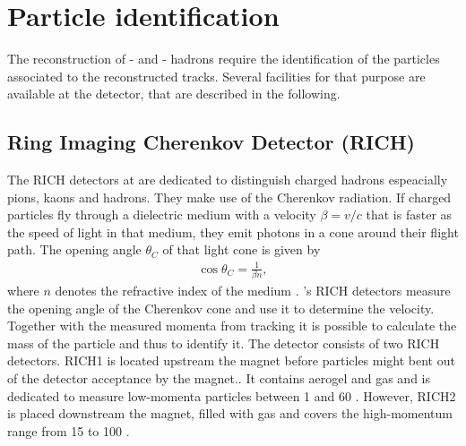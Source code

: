 \section{Particle identification}
The reconstruction of \bquark- and \cquark- hadrons require the identification of the particles associated to the reconstructed tracks.
Several facilities for that purpose are available at the \lhcb detector, that are described in the following.

\subsection{Ring Imaging Cherenkov Detector (RICH)}
The RICH detectors at \lhcb are dedicated to distinguish charged hadrons espeacially pions, kaons and hadrons.
They make use of the Cherenkov radiation.
If charged particles fly through a dielectric medium with a velocity $\beta = v/c$ that is faster as the speed of light in that medium, they emit photons in a cone around their flight path.
The opening angle $\theta_C$ of that light cone is given by
\begin{align}
    \cos \theta_C = \frac{1}{\beta n},
\end{align}
where $n$ denotes the refractive index of the medium \cite{Jackson_ED}.
\lhcb's RICH detectors measure the opening angle of the Cherenkov cone and use it to determine the velocity.
Together with the measured momenta from tracking it is possible to calculate the mass of the particle and thus to identify it.
The \lhcb detector consists of two RICH detectors.
RICH1 is located upstream the magnet before particles might bent out of the \lhcb detector acceptance by the magnet..
It contains aerogel and \cfourften gas and is dedicated to measure low-momenta particles between 1 \gev and 60 \gev.
However, RICH2 is placed downstream the magnet, filled with \cffour gas and covers the high-momentum range from 15 \gev to 100 \gev \cite{detector, RICH_Performance}.

